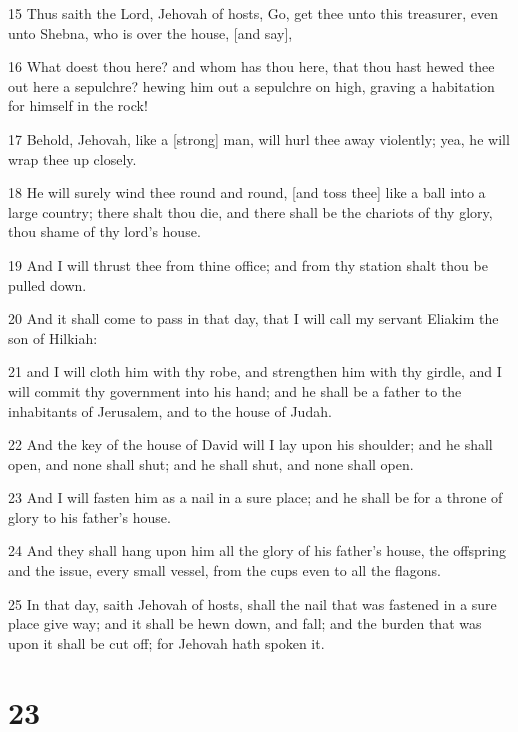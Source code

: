 \par 15 Thus saith the Lord, Jehovah of hosts, Go, get thee unto this treasurer, even unto Shebna, who is over the house, [and say],
\par 16 What doest thou here? and whom has thou here, that thou hast hewed thee out here a sepulchre? hewing him out a sepulchre on high, graving a habitation for himself in the rock!
\par 17 Behold, Jehovah, like a [strong] man, will hurl thee away violently; yea, he will wrap thee up closely.
\par 18 He will surely wind thee round and round, [and toss thee] like a ball into a large country; there shalt thou die, and there shall be the chariots of thy glory, thou shame of thy lord's house.
\par 19 And I will thrust thee from thine office; and from thy station shalt thou be pulled down.
\par 20 And it shall come to pass in that day, that I will call my servant Eliakim the son of Hilkiah:
\par 21 and I will cloth him with thy robe, and strengthen him with thy girdle, and I will commit thy government into his hand; and he shall be a father to the inhabitants of Jerusalem, and to the house of Judah.
\par 22 And the key of the house of David will I lay upon his shoulder; and he shall open, and none shall shut; and he shall shut, and none shall open.
\par 23 And I will fasten him as a nail in a sure place; and he shall be for a throne of glory to his father's house.
\par 24 And they shall hang upon him all the glory of his father's house, the offspring and the issue, every small vessel, from the cups even to all the flagons.
\par 25 In that day, saith Jehovah of hosts, shall the nail that was fastened in a sure place give way; and it shall be hewn down, and fall; and the burden that was upon it shall be cut off; for Jehovah hath spoken it.

\chapter{23}


